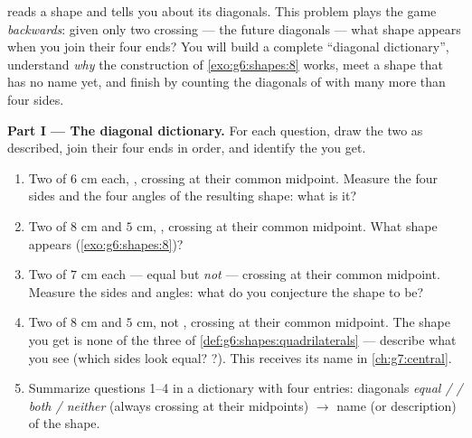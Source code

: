 \begin{problem}
\label{pb:g6:shapes:1}
 reads a shape and tells you about
its diagonals. This problem plays the game \emph{backwards}: given
only two crossing  --- the future diagonals --- what shape
appears when you join their four ends? You will build a complete
``diagonal dictionary'', understand \emph{why} the 
construction of \cref{exo:g6:shapes:8} works, meet a shape that
has no name yet, and finish by counting the diagonals of 
with many more than four sides.

\medskip
\noindent\textbf{Part I --- The diagonal dictionary.}
For each question, draw the two  as described, join their
four ends in order, and identify the  you get.
\begin{enumerate}
  \item Two  of $6$ cm each, , crossing at
        their common midpoint. Measure the four sides and the
        four angles of the resulting shape: what is it?
  \item Two  of $8$ cm and $5$ cm, ,
        crossing at their common midpoint. What shape appears
        (\cref{exo:g6:shapes:8})?
  \item Two  of $7$ cm each --- equal but \emph{not}
         --- crossing at their common midpoint.
        Measure the sides and angles: what do you conjecture the
        shape to be?
  \item Two  of $8$ cm and $5$ cm, not ,
        crossing at their common midpoint. The shape you get is
        none of the three of
        \cref{def:g6:shapes:quadrilaterals} --- describe what
        you see (which sides look equal? ?). This
         receives its name in \cref{ch:g7:central}.
  \item Summarize questions 1--4 in a dictionary with four
        entries: diagonals \emph{equal /  / both /
        neither} (always crossing at their midpoints)
        $\rightarrow$ name (or description) of the shape.
\end{enumerate}


\end{problem}
